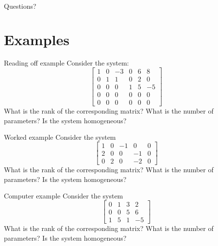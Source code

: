\documentclass{beamer}
\begin{document}
\begin{frame}
  Questions?
\end{frame}

\section{Examples}
\label{sec:Examples-2}

\begin{frame}{Reading off example}
  Consider the system:
  \begin{equation*}
    \left[
      \begin{array}{rrrrr|r}
        1 & 0 & -3 & 0 & 6 & 8  \\
        0 & 1 & 1 & 0 & 2 & 0  \\
        0 & 0 & 0 & 1 & 5 & -5 \\
        0 & 0 & 0 & 0 & 0 & 0\\
        0 & 0 & 0 & 0 & 0 &0
      \end{array}\right] 
  \end{equation*}
  What is the rank of the corresponding matrix?
  What is the number of parameters?
  Is the system homogeneous?
\end{frame}

\begin{frame}{Worked example}
  Consider the system
  \begin{equation*}
    \left[
      \begin{array}{rrrr|r}
        1 & 0 & -1 & 0 & 0 \\
        2 & 0 & 0 & -1 & 0  \\
        0 & 2 & 0 & -2 & 0
      \end{array}\right] 
  \end{equation*}
  What is the rank of the corresponding matrix?
  What is the number of parameters?
  Is the system homogeneous?
\end{frame}

\begin{frame}{Computer example}
  Consider the system
  \begin{equation*}
    \left[
      \begin{array}{rrr|r}
        0 & 1 & 3 & 2  \\
        0 & 0 & 5 & 6   \\
        1 & 5 & 1 & -5 
      \end{array}\right] 
  \end{equation*}
  What is the rank of the corresponding matrix?
  What is the number of parameters?
  Is the system homogeneous?
\end{frame}
\end{document}
